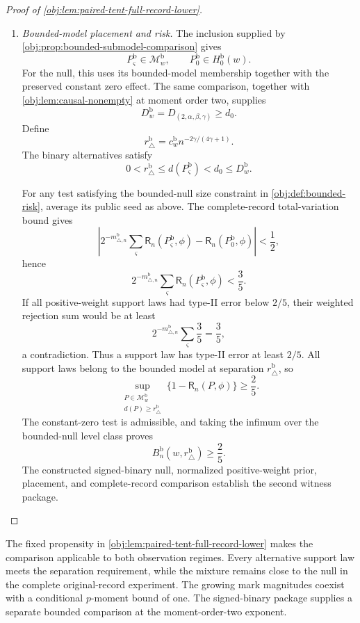 \documentclass[11pt]{article}
\begin{document}
\begin{proof}[Proof of \cref{obj:lem:paired-tent-full-record-lower}]
\begin{enumerate}
\item \emph{Bounded-model placement and risk.}
The inclusion supplied by \cref{obj:prop:bounded-submodel-comparison} gives
\[
P_\varsigma^{\mathrm b}\in\mathcal M_w^{\mathrm b},
\qquad
P_0^{\mathrm b}\in H_0^{\mathrm b}(w).
\]
For the null, this uses its bounded-model membership together with the
preserved constant zero effect. The same comparison, together with
\cref{obj:lem:causal-nonempty} at moment order two, supplies
\[
D_w^{\mathrm b}=D_{(2,\alpha,\beta,\gamma)}\ge d_0.
\]
Define
\[
r_\triangle^{\mathrm b}
=c_w^{\mathrm b}n^{-2\gamma/(4\gamma+1)}.
\]
The binary alternatives satisfy
\[
0<r_\triangle^{\mathrm b}
\le d(P_\varsigma^{\mathrm b})<d_0\le D_w^{\mathrm b}.
\]

For any test satisfying the bounded-null size constraint in
\cref{obj:def:bounded-risk}, average its public seed as above. The
complete-record total-variation bound gives
\[
\left|
2^{-m_{\triangle,n}^{\mathrm b}}\sum_\varsigma
\mathsf R_n(P_\varsigma^{\mathrm b},\phi)
-\mathsf R_n(P_0^{\mathrm b},\phi)
\right|<\frac12,
\]
hence
\[
2^{-m_{\triangle,n}^{\mathrm b}}\sum_\varsigma
\mathsf R_n(P_\varsigma^{\mathrm b},\phi)<\frac35.
\]
If all positive-weight support laws had type-II error below \(2/5\), their
weighted rejection sum would be at least
\[
2^{-m_{\triangle,n}^{\mathrm b}}\sum_\varsigma\frac35=\frac35,
\]
a contradiction. Thus a support law has type-II error at least \(2/5\).
All support laws belong to the bounded model at separation
\(r_\triangle^{\mathrm b}\), so
\[
\sup_{\substack{P\in\mathcal M_w^{\mathrm b}\\
d(P)\ge r_\triangle^{\mathrm b}}}
\{1-\mathsf R_n(P,\phi)\}\ge\frac25.
\]
The constant-zero test is admissible, and taking the infimum over the
bounded-null level class proves
\[
B_n^{\mathrm b}(w,r_\triangle^{\mathrm b})\ge\frac25.
\]
The constructed signed-binary null, normalized positive-weight prior,
placement, and complete-record comparison establish the second witness
package.
\end{enumerate}
\end{proof}

The fixed propensity in \cref{obj:lem:paired-tent-full-record-lower} makes the comparison applicable to both observation regimes. Every alternative support law meets the separation requirement, while the mixture remains close to the null in the complete original-record experiment. The growing mark magnitudes coexist with a conditional \(p\)-moment bound of one. The signed-binary package supplies a separate bounded comparison at the moment-order-two exponent.
\end{document}
